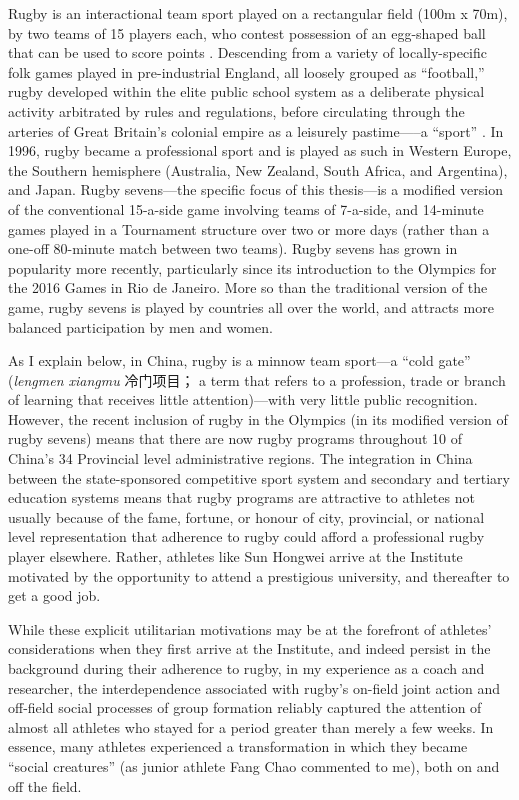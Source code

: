 \begin{CJK}{UTF8}{gbsn}
Rugby is an interactional team sport played on a rectangular field (100m x 70m), by two teams of 15 players each, who contest possession of an egg-shaped ball that can be used to score points \citep{IRB2014}.  Descending from a variety of locally-specific folk games played in pre-industrial England, all loosely grouped as ``football,'' rugby developed within the elite public school system as a deliberate physical activity arbitrated by rules and regulations, before circulating through the arteries of Great Britain's colonial empire as a leisurely pastime—--a ``sport'' \citep{Dunning2005}.  In 1996, rugby became a professional sport and is played as such in Western Europe, the Southern hemisphere (Australia, New Zealand, South Africa, and Argentina), and Japan. Rugby sevens---the specific focus of this thesis---is a modified version of the conventional 15-a-side game involving teams of 7-a-side, and 14-minute games played in a Tournament structure over two or more days (rather than a one-off 80-minute match between two teams).  Rugby sevens has grown in popularity more recently, particularly since its introduction to the Olympics for the 2016 Games in Rio de Janeiro.  More so than the traditional version of the game, rugby sevens is played by countries all over the world, and attracts more balanced participation by men and women.

As I explain below, in China, rugby is a minnow team sport---a ``cold gate'' (\textit{lengmen xiangmu} 冷门项目； a term that refers to a profession, trade or branch of learning that receives little attention)---with very little public recognition.  However, the recent inclusion of rugby in the Olympics (in its modified version of rugby sevens) means that there are now rugby programs throughout 10 of China's 34 Provincial level administrative regions.  The integration in China between the state-sponsored competitive sport system and secondary and tertiary education systems means that rugby programs are attractive to athletes not usually because of the fame, fortune, or honour of city, provincial, or national level representation that adherence to rugby could afford a professional rugby player elsewhere. Rather, athletes like Sun Hongwei arrive at the Institute motivated by the opportunity to attend a prestigious university, and thereafter to get a good job.

While these explicit utilitarian motivations may be at the forefront of athletes' considerations when they first arrive at the Institute, and indeed persist in the background during their adherence to rugby, in my experience as a coach and researcher, the interdependence associated with rugby's on-field joint action and off-field social processes of group formation reliably captured the attention of almost all athletes who stayed for a period greater than merely a few weeks. In essence, many athletes experienced a transformation in which they became ``social creatures'' (as junior athlete Fang Chao commented to me), both on and off the field.



\end{CJK}
